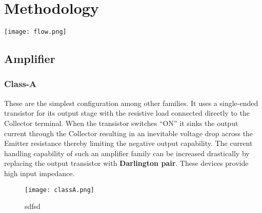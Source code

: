\documentclass[class=article,crop=false]{standalone}
\begin{document}
\twocolumn
\section{Methodology}
\begin{center}
    \texttt{[image: flow.png]}
\end{center}

\subsection{Amplifier}
\subsubsection*{Class-A }
These are the simplest configuration among other families. It uses a single-ended transistor for its output stage with the resistive load connected directly to the Collector terminal. When the transistor switches “ON” it sinks the output current through the Collector resulting in an inevitable voltage drop across the Emitter resistance thereby limiting the negative output capability.  The current handling capability of such an amplifier family can be increased drastically by replacing the output transistor with \textbf{Darlington pair}. These devices provide high input impedance.
\begin{figure}
    \begin{center}
        \texttt{[image: classA.png]}
        \caption*{sdfsd}
    \end{center}
\end{figure}
\end{document}
